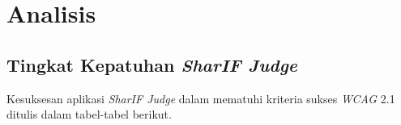 \chapter{Analisis}
\label{chap:analisis}


\section{Tingkat Kepatuhan \textit{SharIF Judge}}
\label{sec:kepatuhan_sharif_judge_terhadap_wcag_2.1}
Kesuksesan aplikasi \textit{SharIF Judge} dalam mematuhi kriteria sukses \textit{WCAG} 2.1 ditulis dalam tabel-tabel berikut.

